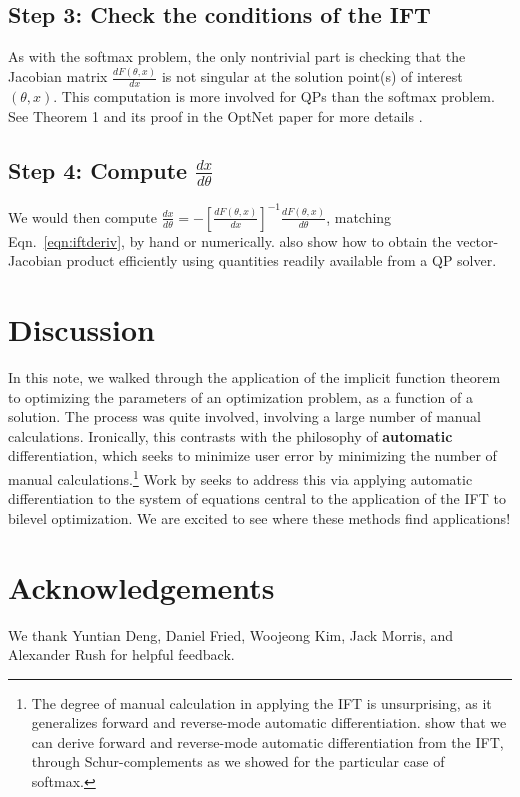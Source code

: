 \documentclass[11pt]{article}
\begin{document}
\subsection*{Step 3: Check the conditions of the IFT}
As with the softmax problem,
the only nontrivial part is checking that the Jacobian matrix $\frac{dF(\theta,x)}{dx}$ is
not singular at the solution point(s) of interest $(\theta,x)$.
This computation is more involved for QPs than the softmax problem. 
See Theorem 1 and its proof in the OptNet paper for more details \citep{optnet}.

\subsection*{Step 4: Compute $\frac{dx}{d\theta}$}
We would then compute
$\frac{dx}{d\theta} = -\left[\frac{dF(\theta,x)}{dx}\right]^{-1}\frac{dF(\theta,x)}{d\theta}$,
matching Eqn.~\ref{eqn:iftderiv},
by hand or numerically.
\citet{optnet} also show how to obtain the vector-Jacobian product efficiently
using quantities readily available from a QP solver.

\section{Discussion}
In this note, we walked through the application of the implicit function theorem
to optimizing the parameters of an optimization problem, as a function of a solution.
The process was quite involved, involving a large number of manual calculations.
Ironically, this contrasts with the philosophy of \textbf{automatic} differentiation,
which seeks to minimize user error by minimizing the number of manual calculations.\footnote{
The degree of manual calculation in applying the IFT is unsurprising,
as it generalizes forward and reverse-mode automatic differentiation.
\citet{griewank2008autodiff} show that we can derive forward and reverse-mode automatic differentiation
from the IFT, through Schur-complements as we showed for the particular case of softmax.
}
Work by \citet{adift} seeks to address this via applying automatic differentiation to the
system of equations central to the application of the IFT to bilevel optimization.
We are excited to see where these methods find applications!

\section*{Acknowledgements}
We thank Yuntian Deng, Daniel Fried, Woojeong Kim, Jack Morris, and Alexander Rush for helpful feedback.


\end{document}
